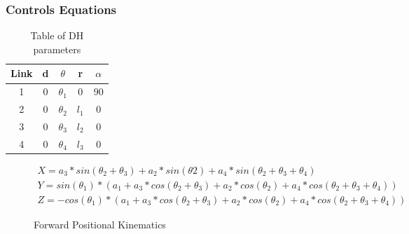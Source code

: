         \subsubsection{Controls Equations}
        \begin{table}[H]
            \centering
            \begin{tabular}{|c|c|c|c|c|}
            \hline
                Link & d & $\theta$ & r & $\alpha$\\
                \hline
                1 & 0 & $\theta_1$ & 0 & 90 \\
                2 & 0 &$\theta_2$ & $l_1$ & 0  \\
                3 & 0 &$\theta_3$ & $l_2$ & 0 \\
                4 & 0 &$\theta_4$ & $l_3$ & 0  \\
                \hline
                \end{tabular}
            \caption{Table of DH parameters}
            \label{tab:DHTable}
        \end{table}
        
        \begin{figure}[H]
        \centering
        \begin{gather*}
        X = a_3*sin(\theta_2+\theta_3)+a_2*sin(\theta2)+a_4*sin(\theta_2+\theta_3+\theta_4)\\
        Y = sin(\theta_1)*(a_1+a_3*cos(\theta_2+\theta_3)+a_2*cos(\theta_2)+a_4*cos(\theta_2+\theta_3+\theta_4))\\
        Z = -cos(\theta_1)*(a_1+a_3*cos(\theta_2+\theta_3)+a_2*cos(\theta_2)+a_4*cos(\theta_2+\theta_3+\theta_4))
        \end{gather*}
        
        \caption{Forward Positional Kinematics}
        \label{fig:FWKin_Robot}
        \end{figure}
        

        
